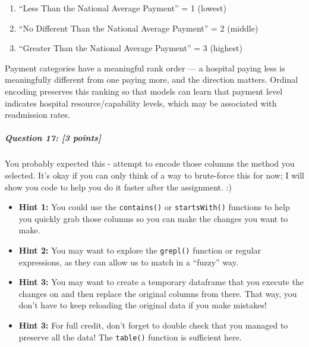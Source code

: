 \documentclass[
]{article}
\providecommand{\tightlist}{%
  \setlength{\itemsep}{0pt}\setlength{\parskip}{0pt}}
\begin{document}
\begin{enumerate}
\def\labelenumi{\arabic{enumi}.}
\tightlist
\item
  ``Less Than the National Average Payment'' = 1 (lowest)
\item
  ``No Different Than the National Average Payment'' = 2 (middle)
\item
  ``Greater Than the National Average Payment'' = 3 (highest)
\end{enumerate}

Payment categories have a meaningful rank order --- a hospital paying
less is meaningfully different from one paying more, and the direction
matters. Ordinal encoding preserves this ranking so that models can
learn that payment level indicates hospital resource/capability levels,
which may be associated with readmission rates.

\subparagraph{\texorpdfstring{\textbf{Question 17}: {[}3
points{]}}{Question 17: {[}3 points{]}}}\label{question-17-3-points}

You probably expected this - attempt to encode those columns the method
you selected. It's okay if you can only think of a way to brute-force
this for now; I will show you code to help you do it faster after the
assignment. :)

\begin{itemize}
\item
  \textbf{Hint 1: }You could use the \texttt{contains()} or
  \texttt{startsWith()} functions to help you quickly grab those columns
  so you can make the changes you want to make.
\item
  \textbf{Hint 2: }You may want to explore the \texttt{grepl()} function
  or regular expressions, as they can allow us to match in a ``fuzzy''
  way.
\item
  \textbf{Hint 3: }You may want to create a temporary dataframe that you
  execute the changes on and then replace the original columns from
  there. That way, you don't have to keep reloading the original data if
  you make mistakes!
\item
  \textbf{Hint 3: }For full credit, don't forget to double check that
  you managed to preserve all the data! The \texttt{table()} function is
  sufficient here.
\end{itemize}
\end{document}
